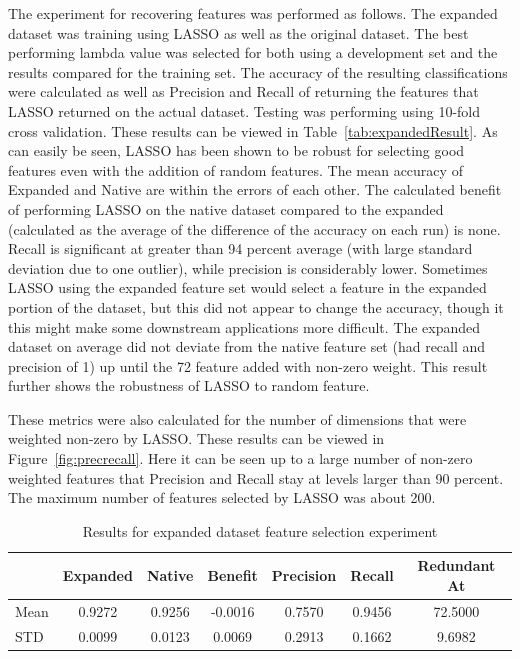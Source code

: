 The experiment for recovering features was performed as follows. The expanded dataset was training using LASSO as well as the original dataset. The best performing lambda value was selected for both using a development set and the results compared for the training set. The accuracy of the resulting classifications were calculated as well as Precision and Recall of returning the features that LASSO returned on the actual dataset. Testing was performing using 10-fold cross validation. These results can be viewed in Table~\ref{tab:expandedResult}. As can easily be seen, LASSO has been shown to be robust for selecting good features even with the addition of random features. The mean accuracy of Expanded and Native are within the errors of each other. The calculated benefit of performing LASSO on the native dataset compared to the expanded (calculated as the average of the difference of the accuracy on each run) is none. Recall is significant at greater than 94 percent average (with large standard deviation due to one outlier), while precision is considerably lower. Sometimes LASSO using the expanded feature set would select a feature in the expanded portion of the dataset, but this did not appear to change the accuracy, though it this might make some downstream applications more difficult. The expanded dataset on average did not deviate from the native feature set (had recall and precision of 1) up until the 72 feature added with non-zero weight. This result further shows the robustness of LASSO to random feature.

These metrics were also calculated for the number of dimensions that were weighted non-zero by LASSO. These results can be viewed in Figure~\ref{fig:precrecall}. Here it can be seen up to a large number of non-zero weighted features that Precision and Recall stay at levels larger than 90 percent. The maximum number of features selected by LASSO was about 200.

\begin{table}
\begin{tabular}{lcccccc}
\hline
&Expanded&Native&Benefit&Precision&Recall&Redundant At
\\
\hline
Mean&0.9272&0.9256&-0.0016&0.7570&0.9456&72.5000 \\
STD&0.0099&0.0123&0.0069&0.2913&0.1662&9.6982
\end{tabular}
\caption{Results for expanded dataset feature selection experiment}
\label{expandedResult}
\end{table}